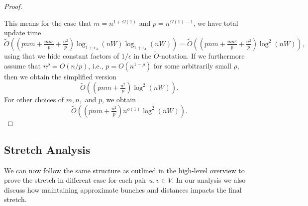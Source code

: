 \begin{proof}
\begin{itemize}
\end{itemize}
This means for the case that $m=n^{1+\Omega(1)}$ and $p=n^{\Omega(1)-1}$, we have total update time
$$ \tilde O ((pnm + \tfrac{mn^{\rho}}{p}  + \tfrac{n^2}{ p})\log_{1+\epsilon_3}(nW)\log_{1+\epsilon_4}(nW)) = \tilde O ((pnm + \tfrac{mn^{\rho}}{p} + \tfrac{n^2}{ p})\log^2(nW)), $$
using that we hide constant factors of $1/\epsilon$ in the $\tilde O$-notation. If we furthermore assume that $n^\rho = O(n/p)$, i.e., $p = O(n^{1-\rho})$ for some arbitrarily small $\rho$, then we obtain the simplified version
$$ \tilde O ((pnm +   \tfrac{n^2}{ p})\log^2(nW)).$$
For other choices of $m,n,$ and $p$, we obtain 
$$ \tilde O ((pnm + \tfrac{n^2}{ p})n^{o(1)}\log^2(nW)). $$
\end{proof}



\subsection{Stretch Analysis}\label{sc:mult_stretch}
We can now follow the same structure as outlined in the high-level overview to prove the stretch in different case for each pair $u,v \in V$. In our analysis we also discuss how maintaining approximate bunches and distances impacts the final stretch.

